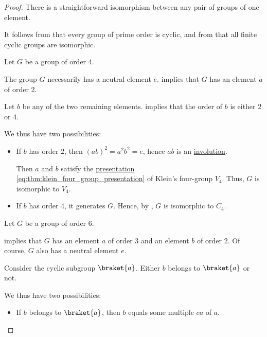 \begin{proof}
   There is a straightforward isomorphism between any pair of groups of one element.

   It follows from  that every group of prime order is cyclic, and from  that all finite cyclic groups are isomorphic.

   Let \( G \) be a group of order \( 4 \).

  The group \( G \) necessarily has a neutral element \( e \).  implies that \( G \) has an element \( a \) of order \( 2 \).

  Let \( b \) be any of the two remaining elements.  implies that the order of \( b \) is either \( 2 \) or \( 4 \).

  We thus have two possibilities:
  \begin{itemize}
    \item If \( b \) has order \( 2 \), then \( (ab)^2 = a^2 b^2 = e \), hence \( ab \) is an \hyperref[def:group_element_order]{involution}.

    Then \( a \) and \( b \) satisfy the \hyperref[def:group_presentation]{presentation} \eqref{eq:thm:klein_four_group_presentation} of Klein's four-group \( V_4 \). Thus, \( G \) is isomorphic to \( V_4 \).

    \item If \( b \) has order \( 4 \), it generates \( G \). Hence, by , \( G \) is isomorphic to \( C_4 \).
  \end{itemize}

   Let \( G \) be a group of order \( 6 \).

   implies that \( G \) has an element \( a \) of order \( 3 \) and an element \( b \) of order \( 2 \). Of course, \( G \) also has a neutral element \( e \).

  Consider the cyclic subgroup \( \braket{ a } \). Either \( b \) belongs to \( \braket{ a } \) or not.

  We thus have two possibilities:
  \begin{itemize}
    \item If \( b \) belongs to \( \braket{ a } \), then \( b \) equals some multiple \( ca \) of \( a \).


\end{itemize}
\end{proof}
